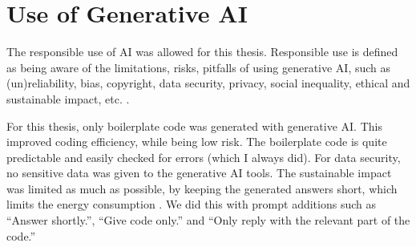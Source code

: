 \chapter{Use of Generative AI}

The responsible use of AI was allowed for this thesis. Responsible use is defined as being aware of the limitations, risks, pitfalls of using generative AI, such as (un)reliability, bias, copyright, data security, privacy, social inequality, ethical and sustainable impact, etc. \cite{ugent2025verantwoord}.

For this thesis, only boilerplate code was generated with generative AI. This improved coding efficiency, while being low risk. The boilerplate code is quite predictable and easily checked for errors (which I always did). For data security, no sensitive data was given to the generative AI tools. The sustainable impact was limited as much as possible, by keeping the generated answers short, which limits the energy consumption \cite{poddar2025towards}. We did this with prompt additions such as ``Answer shortly.'', ``Give code only.'' and ``Only reply with the relevant part of the code.''
